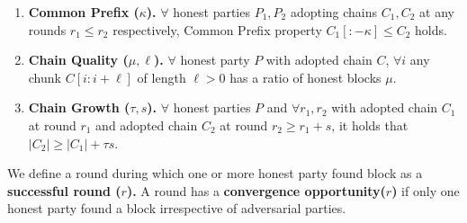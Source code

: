 \begin{enumerate}
    \item \textbf{Common Prefix (\texorpdfstring{$\kappa$}{Lg}).}
    $\forall$ honest parties $P_1, P_2$ adopting chains $C_1, C_2$ at any rounds $r_1 \leq r_2$ respectively, Common Prefix property  $C_1[:-\kappa] \leq C_2$ holds.
    \item \textbf{Chain Quality (\texorpdfstring{$\mu, \ell$}{Lg}).}
    $\forall$ honest party $P$ with adopted chain $C$,  $\forall i$ any chunk $C[i: i+\ell]$ of length $\ell > 0$ has a ratio of honest blocks $\mu$.
    \item \textbf{Chain Growth (\texorpdfstring{$\tau, s$}{Lg}).}
    $\forall$ honest parties $P$ and $\forall r_1, r_2$ with adopted chain $C_1$ at round $r_1$ and adopted chain $C_2$ at round $r_2 \geq r_1 + s$, it holds that $|C_2| \geq |C_1| + \tau s$.
\end{enumerate}


We define a round during which one or more honest party found block as a \textbf{successful round (\texorpdfstring{$r$}{Lg}).} A round has a \textbf{convergence opportunity(\texorpdfstring{$r$}{Lg})} if only one honest party found a block irrespective of adversarial parties.


